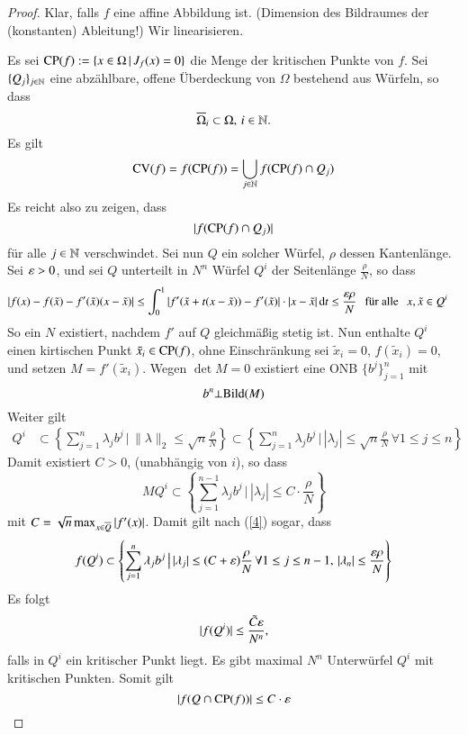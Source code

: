 \begin{proof}
    Klar, falls $f$ eine affine Abbildung ist. (Dimension des Bildraumes der (konstanten) Ableitung!)
    Wir linearisieren. 

    \noindent Es sei $\mathrm{CP}(f):=\{x\in \Omega\,|\, J_f(x)=0\}$ die Menge der kritischen Punkte von $f$.
    Sei $\{ Q_j \}_{j\in \mathbb{N}}$ eine abzählbare, offene Überdeckung von $\Omega$ bestehend aus Würfeln,
    so dass
    \[
        \overline \Omega_i\subset \Omega, \, i\in \mathbb{N}.
    \]
    Es gilt 
    \[
        \mathrm{CV}(f)=f(\mathrm{CP}(f))=\bigcup_{j\in \mathbb{N}} f(\mathrm{CP}(f)\cap Q_j)
    \]
    Es reicht also zu zeigen, dass
    \[
    |f(\mathrm{CP}(f)\cap Q_j)|
    \]
    für alle $j\in \mathbb{N}$ verschwindet. Sei nun $Q$ ein solcher Würfel, $\rho$ dessen Kantenlänge.
    Sei $\varepsilon >0$, und sei $Q$ unterteilt in $N^n$ Würfel $Q^i$ der Seitenlänge $\frac{\rho}{N}$, so
    dass
    \begin{align}\label{4}
        |f(x)-f(\tilde x)-f'(\tilde x)(x-\tilde x)|&\leq \int_0^1|f'(\tilde x+t(x-\tilde x))-
        f'(\tilde x)|\cdot|x-\tilde x|\, \mathrm{d} t\leq \frac{\varepsilon\rho}{N} \hspace{.25cm} \text{für alle} 
            \hspace{.25cm} x,\tilde x \in Q^i
    \end{align}
    So ein $N$ existiert, nachdem $f'$ auf $Q$ gleichmäßig stetig ist. Nun enthalte $Q^i$ einen
    kirtischen Punkt $\tilde x_i \in \mathrm{CP}(f)$, ohne Einschränkung sei $\tilde x_i=0$, $f(\tilde x_i)=0$,
    und setzen $M=f'(\tilde x _i)$. Wegen $\det M =0$ existiert eine ONB $\{b^j\}_{j=1}^n$ mit
    \[
    b^n \bot \mathrm{Bild}(M)
    \]
    Weiter gilt 
    \begin{align*}
        Q^i&\subset \left\{ \sum_{j=1}^n \lambda _j b^j \, \big| \, \| \lambda \|_2\leq \sqrt{n} 
            \frac{\rho}{N} \right\}\subset\left\{\sum_{j=1}^n\lambda _jb^j \, \big|
            \, |\lambda_j|\leq \sqrt{n}\frac{\rho}{N} \, \forall 1\leq j\leq n\right\}
    \end{align*}
    Damit existiert $C>0$, (unabhängig von $i$), so dass
    \[
        MQ^i\subset \left\{\sum_{j=1}^{n-1}\lambda_jb^j\, \big| \, |\lambda_j|
            \leq C\cdot \frac{\rho}{N} \right\}
    \]
    mit $C=\sqrt{n} \max_{x\in \overline Q}|f'(x)| $. Damit gilt nach (\ref{4}) sogar, dass
    \[
        f(Q^i)\subset\left\{ \sum_{j=1}^n \lambda_jb^j\, \big| \, |\lambda_j|\leq 
        (C+\varepsilon)\frac{\rho}{N} \, \forall 1\leq j\leq n-1, \, |\lambda_n|\leq \frac{\varepsilon\rho}{N}\right\}
    \]
    Es folgt
    \[
        |f(Q^i)|\leq \frac{\tilde C\varepsilon}{N^n},
    \]
    falls in $Q^i$ ein kritischer Punkt liegt. Es gibt maximal $N^n$ Unterwürfel $Q^i$ mit kritischen
    Punkten. Somit gilt
    \[
        |f(Q\cap \mathrm{CP}(f))|\leq C\cdot \varepsilon
    \]
\end{proof}

